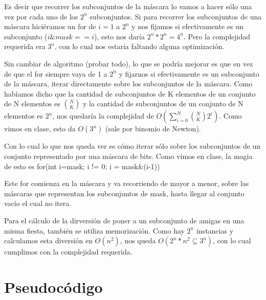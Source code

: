 Es decir que recorrer los subconjuntos de la máscara lo vamos a hacer sólo una vez por cada uno de los $2^{n}$ subconjuntos. Si para recorrer los subconjuntos de una máscara hiciéramos un for de $i = 1$ a $2^{n}$ y nos fijamos si efectivamente es un subconjunto ($i \& mask == i$), esto nos daría $2^{n} * 2^{n} = 4^{n}$. Pero la complejidad requerida era $3^{n}$, con lo cual nos estaría faltando alguna optimización. \newline


Sin cambiar de algoritmo (probar todo), lo que se podría mejorar es que en vez de que el for siempre vaya de 1 a $2^{n}$ y fijarnos si efectivamente es un subconjunto de la máscara, iterar directamente sobre los subconjuntos de la máscara. Como habíamos dicho que la cantidad de subconjuntos de K elementos de un conjunto de N elementos es $\binom{N}{K}$ y la cantidad de subconjuntos de un conjunto de N elementos es $2^{n}$, nos quedaría la complejidad de $O(\sum_{i=0}^{N} \binom{N}{K} 2^{i} )$. Como vimos en clase, esto da $O(3^{n})$ (sale por binomio de Newton). \newline

Con lo cual lo que nos queda ver es cómo iterar sólo sobre los subconjuntos de un conjunto representado por una máscara de bits. Como vimos en clase, la magia de esto es  \newline for(int i=mask; i != 0; i = mask\&(i-1))  \newline

Este for comienza en la máscara y va recorriendo de mayor a menor, sobre las máscaras que representan los subconjuntos de mask, hasta llegar al conjunto vacío el cual no itera. \newline

Para el cálculo de la dirversión de poner a un subconjunto de amigas en una misma fiesta, también se utiliza memorización. Como hay $2^{n}$ instancias y calculamos esta diversión en $O(n^{2})$, nos queda $O(2^{n}*n^{2} \subseteq 3^{n})$, con lo cual cumplimos con la complejidad requerida.

\section{Pseudocódigo}

